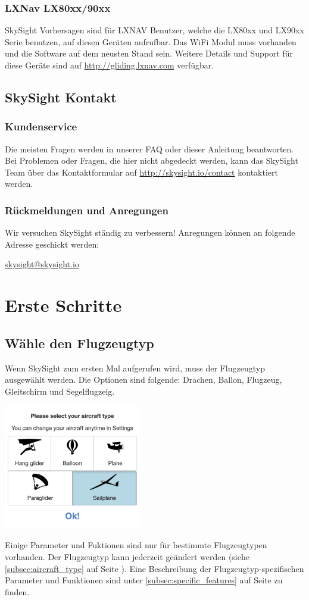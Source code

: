 \documentclass[11pt,a4paper]{article}
\begin{document}
\subsubsection{LXNav LX80xx/90xx}
SkySight Vorhersagen sind für LXNAV Benutzer, welche die LX80xx und LX90xx Serie benutzen, auf diesen Geräten aufrufbar. Das WiFi Modul muss vorhanden und die Software auf dem neusten Stand sein. Weitere Details und Support für diese Geräte sind auf \url{http://gliding.lxnav.com} verfügbar.
\subsection{SkySight Kontakt}
\subsubsection{Kundenservice}
Die meisten Fragen werden in unserer FAQ oder dieser Anleitung beantworten. Bei Problemen oder Fragen, die hier nicht abgedeckt werden, kann das SkySight Team über das Kontaktformular auf \url{http://skysight.io/contact} kontaktiert werden.
\subsubsection{Rückmeldungen und Anregungen}
Wir versuchen SkySight ständig zu verbessern! Anregungen können an folgende Adresse geschickt werden: 
\begin{flushleft}
\url{skysight@skysight.io}
\end{flushleft}
\section{Erste Schritte}

\subsection{Wähle den Flugzeugtyp}
Wenn SkySight zum ersten Mal aufgerufen wird, muss der Flugzeugtyp ausgewählt werden. Die Optionen sind folgende: Drachen, Ballon, Flugzeug, Gleitschirm und Segelflugzeig. 
\begin{center}
\includegraphics[width=6cm]{images/aircraft_type.png}
\end{center}
Einige Parameter und Fuktionen sind nur für bestimmte Flugzeugtypen vorhanden. Der Flugzeugtyp kann jederzeit geändert werden (siehe \ref{subsec:aircraft_type} auf Seite \pageref{subsec:aircraft_type}). Eine Beschreibung der Flugzeugtyp-spezifischen Parameter und Funktionen sind unter \ref{subsec:specific_features} auf Seite \pageref{subsec:specific_features} zu finden.
\end{document}
